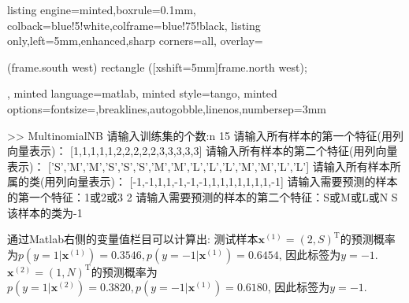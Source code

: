 \documentclass{article}
\begin{document}
\begin{homeworkProblem}
\begin{tcblisting}{listing engine=minted,boxrule=0.1mm,
colback=blue!5!white,colframe=blue!75!black,
listing only,left=5mm,enhanced,sharp corners=all,
overlay={\begin{tcbclipinterior} (frame.south west)
rectangle ([xshift=5mm]frame.north west);\end{tcbclipinterior}},
minted language=matlab,
minted style=tango,
minted options={fontsize=\normalsize,breaklines,autogobble,linenos,numbersep=3mm}}
>> MultinomialNB
请输入训练集的个数:n
15
请输入所有样本的第一个特征(用列向量表示)：
[1,1,1,1,1,2,2,2,2,2,3,3,3,3,3]
请输入所有样本的第二个特征(用列向量表示)：
['S','M','M','S','S','S','M','M','L','L','L','M','M','L','L']
请输入所有样本所属的类(用列向量表示)：
[-1,-1,1,1,-1,-1,-1,1,1,1,1,1,1,1,-1]
请输入需要预测的样本的第一个特征：1或2或3 
2
请输入需要预测的样本的第二个特征：S或M或L或N
S
该样本的类为-1
\end{tcblisting}
	通过Matlab右侧的变量值栏目可以计算出: 测试样本$\boldsymbol{x}^{(1)}=(2,S)^{\text{T}}$的预测概率为$p\left( y=1|\boldsymbol{x}^{\left( 1 \right)} \right)=0.3546,p\left( y=-1|\boldsymbol{x}^{\left( 1 \right)} \right)=0.6454$, 因此标签为$y=-1$. $\boldsymbol{x}^{(2)}=(1,N)^{\text{T}}$的预测概率为$p\left( y=1|\boldsymbol{x}^{\left( 2 \right)} \right)=0.3820,p\left( y=-1|\boldsymbol{x}^{\left( 1 \right)} \right)=0.6180$, 因此标签为$y=-1$.
\end{homeworkProblem}


\pagebreak
\end{document}

